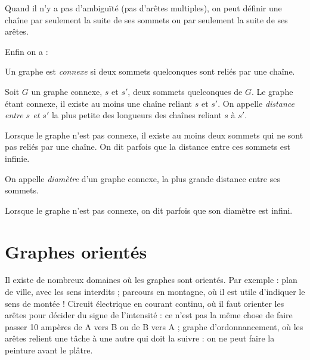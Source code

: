 \documentclass[french]{book}
\begin{document}
\begin{rem} Quand il n'y a pas d'ambiguïté (pas d'arêtes multiples), on peut définir une chaîne
par seulement la suite de ses sommets ou par seulement la suite de ses arêtes. \end{rem}

Enfin on a :

\begin{defn} Un graphe est \emph{connexe} si deux sommets quelconques sont reliés par une chaîne. \end{defn}

\begin{defn} Soit $G$ un graphe connexe, $s$ et $s'$, deux sommets quelconques de $G$. Le graphe étant connexe, il existe au moins une chaîne reliant $s$ et $s'$. On appelle \emph{distance entre $s$ et $s'$} la plus petite des longueurs des chaînes reliant $s$ à $s'$. \end{defn}

\begin{rem} Lorsque le graphe n'est pas connexe, il existe au moins deux sommets qui ne sont pas reliés par une chaîne. On dit parfois que la distance entre ces sommets est infinie.
\end{rem}

\begin{defn} On appelle \emph{diamètre} d'un graphe connexe, la plus grande distance entre ses sommets. \end{defn}

\begin{rem} Lorsque le graphe n'est pas connexe, on dit parfois que son diamètre est infini.
\end{rem}


\section{Graphes orientés}

Il existe de nombreux domaines où les graphes sont orientés. Par exemple : plan de ville, avec les
sens interdits ; parcours en montagne, où il est utile d'indiquer le sens de montée ! Circuit électrique
en courant continu, où il faut orienter les arêtes pour décider du signe de l'intensité : ce n'est pas
la même chose de faire passer 10 ampères de A vers B ou de B vers A ; graphe d'ordonnancement,
où les arêtes relient une tâche à une autre qui doit la suivre : on ne peut faire la peinture avant le
plâtre.
\end{document}
